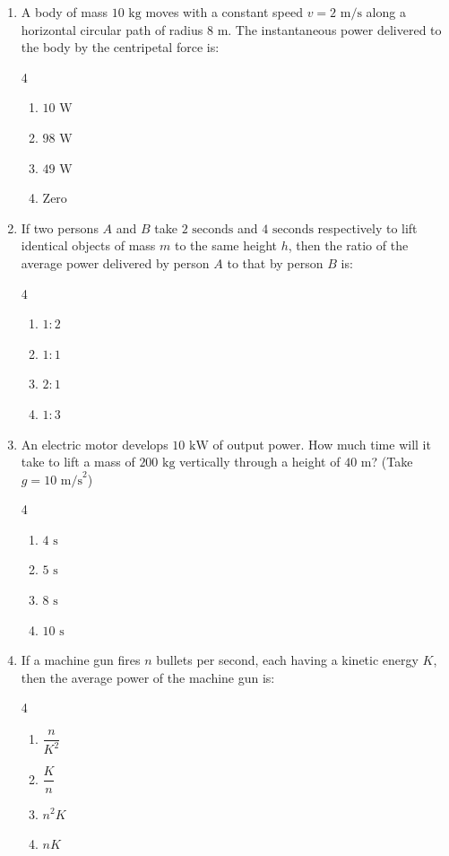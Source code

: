 \documentclass[11pt,a4paper]{article}
\begin{document}
\begin{enumerate}[label=\textbf{\arabic*.},leftmargin=18pt,itemsep=8pt]
  \item A body of mass $10\text{ kg}$ moves with a constant speed $v = 2\text{ m/s}$ along a horizontal circular path of radius $8\text{ m}$. The instantaneous power delivered to the body by the centripetal force is:
  \begin{multicols}{4}
    \begin{enumerate}[label=(\Alph*)]
      \item $10\text{ W}$
      \item $98\text{ W}$
      \item $49\text{ W}$
      \item $\text{Zero}$
    \end{enumerate}
  \end{multicols}

  \item If two persons $A$ and $B$ take $2\text{ seconds}$ and $4\text{ seconds}$ respectively to lift identical objects of mass $m$ to the same height $h$, then the ratio of the average power delivered by person $A$ to that by person $B$ is:
  \begin{multicols}{4}
    \begin{enumerate}[label=(\Alph*)]
      \item $1 : 2$
      \item $1 : 1$
      \item $2 : 1$
      \item $1 : 3$
    \end{enumerate}
  \end{multicols}

  \item An electric motor develops $10\text{ kW}$ of output power. How much time will it take to lift a mass of $200\text{ kg}$ vertically through a height of $40\text{ m}$? (Take $g = 10\text{ m/s}^2$)
  \begin{multicols}{4}
    \begin{enumerate}[label=(\Alph*)]
      \item $4\text{ s}$
      \item $5\text{ s}$
      \item $8\text{ s}$
      \item $10\text{ s}$
    \end{enumerate}
  \end{multicols}

  \item If a machine gun fires $n$ bullets per second, each having a kinetic energy $K$, then the average power of the machine gun is:
  \begin{multicols}{4}
    \begin{enumerate}[label=(\Alph*)]
      \item $\dfrac{n}{K^2}$
      \item $\dfrac{K}{n}$
      \item $n^2 K$
      \item $nK$
    \end{enumerate}
  \end{multicols}


\end{enumerate}
\end{document}
